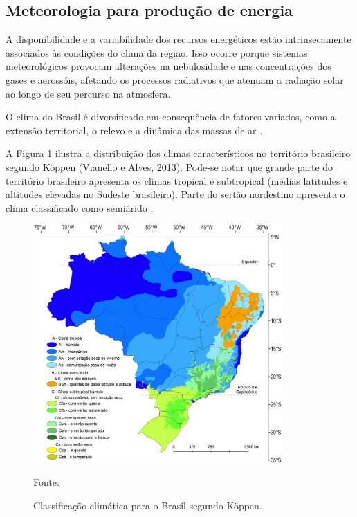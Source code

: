 \subsection{Meteorologia para produção de energia}

A disponibilidade e a variabilidade dos recursos energéticos estão intrinsecamente associados às condições do clima da região. Isso ocorre porque sistemas meteorológicos provocam alterações na nebulosidade e nas concentrações dos gases e aerossóis, afetando os processos radiativos que atenuam a radiação solar ao longo de seu percurso na atmosfera.

O clima do Brasil é diversificado em consequência de fatores variados, como a extensão territorial, o relevo e a dinâmica das massas de ar \cite{atlas2017}.

A Figura \ref{fig:classificacao_clima} ilustra a distribuição dos climas característicos no território brasileiro segundo Köppen (Vianello e Alves, 2013). Pode‐se notar que grande parte do território brasileiro apresenta os climas tropical e subtropical (médias latitudes e altitudes elevadas no Sudeste brasileiro). Parte do sertão nordestino apresenta o clima classificado como semiárido \cite{atlas2017}.

\begin{figure}[H]
    \centering
    \includegraphics[width=0.85\textwidth]{./Figuras/classificacao_clima.jpg}
    \caption{Classificação climática para o Brasil segundo Köppen.}{Fonte: \cite{Koppen}}
   \label{fig:classificacao_clima}
\end{figure}

